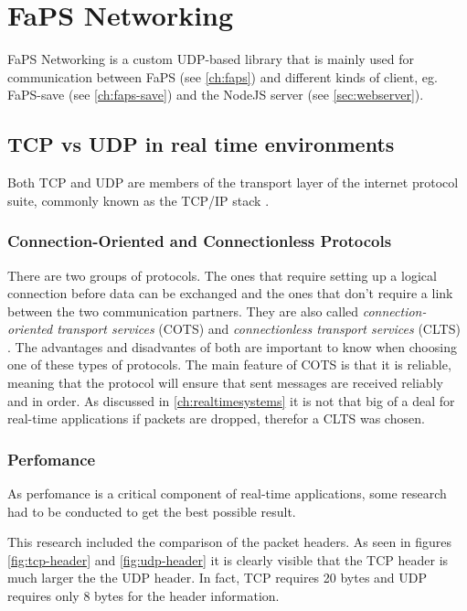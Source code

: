 \chapter{FaPS Networking}
\label{ch:faps-networking}

\author{Nico Kratky}
%

FaPS Networking is a custom UDP-based library that is mainly used for communication between FaPS (see \ref{ch:faps}) and different kinds of client, eg. FaPS-save (see \ref{ch:faps-save}) and the NodeJS server (see
\ref{sec:webserver}).

\section{TCP vs UDP in real time environments}

Both TCP and UDP are members of the transport layer of the internet protocol suite, commonly known as the TCP/IP stack \cite{rfc1122}.

\subsection{Connection-Oriented and Connectionless Protocols}

There are two groups of protocols. The ones that require setting up a logical connection before data can be exchanged and the ones that don't require a link between the two communication partners. They are also called
\textit{connection-oriented transport services} (COTS) and \textit{connectionless transport services} (CLTS) \cite{connectionbased-vs-connectionless}. The advantages and disadvantes of both are important to know when choosing one of these types of protocols.
The main feature of COTS is that it is reliable, meaning that the protocol will ensure that sent messages are received reliably and in order. As discussed in \ref{ch:realtimesystems} it is not that big of a deal for
real-time applications if packets are dropped, therefor a CLTS was chosen.

\subsection{Perfomance}

As perfomance is a critical component of real-time applications, some research had to be conducted to get the best possible result.

This research included the comparison of the packet headers. As seen in figures \ref{fig:tcp-header} and \ref{fig:udp-header} it is clearly visible that the TCP header is much larger the the UDP header. In fact, TCP requires 20 bytes and UDP requires only 8 bytes for the header information.

